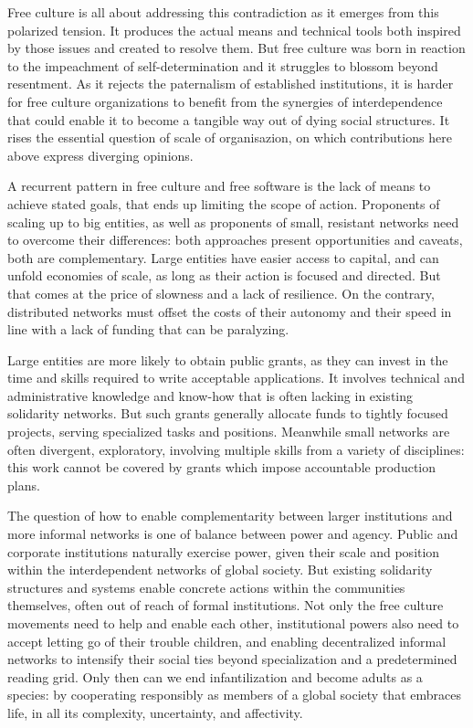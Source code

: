 Free culture is all about addressing this contradiction as it emerges
from this polarized tension. It produces the actual means and technical
tools both inspired by those issues and created to resolve them. But
free culture was born in reaction to the impeachment of
self-determination and it struggles to blossom beyond resentment. As it
rejects the paternalism of established institutions, it is harder for
free culture organizations to benefit from the synergies of
interdependence that could enable it to become a tangible way out of
dying social structures. It rises the essential question of scale of
organisazion, on which contributions here above express diverging
opinions.

A recurrent pattern in free culture and free software is the lack of
means to achieve stated goals, that ends up limiting the scope of
action. Proponents of scaling up to big entities, as well as proponents
of small, resistant networks need to overcome their differences: both
approaches present opportunities and caveats, both are complementary.
Large entities have easier access to capital, and can unfold economies
of scale, as long as their action is focused and directed. But that
comes at the price of slowness and a lack of resilience. On the
contrary, distributed networks must offset the costs of their autonomy
and their speed in line with a lack of funding that can be paralyzing.

Large entities are more likely to obtain public grants, as they can
invest in the time and skills required to write acceptable applications.
It involves technical and administrative knowledge and know-how that is
often lacking in existing solidarity networks. But such grants generally
allocate funds to tightly focused projects, serving specialized tasks
and positions. Meanwhile small networks are often divergent,
exploratory, involving multiple skills from a variety of disciplines:
this work cannot be covered by grants which impose accountable
production plans.

The question of how to enable complementarity between larger
institutions and more informal networks is one of balance between power
and agency. Public and corporate institutions naturally exercise power,
given their scale and position within the interdependent networks of
global society. But existing solidarity structures and systems enable
concrete actions within the communities themselves, often out of reach
of formal institutions. Not only the free culture movements need to help
and enable each other, institutional powers also need to accept letting
go of their trouble children, and enabling decentralized informal
networks to intensify their social ties beyond specialization and a
predetermined reading grid. Only then can we end infantilization and
become adults as a species: by cooperating responsibly as members of a
global society that embraces life, in all its complexity, uncertainty,
and affectivity.
